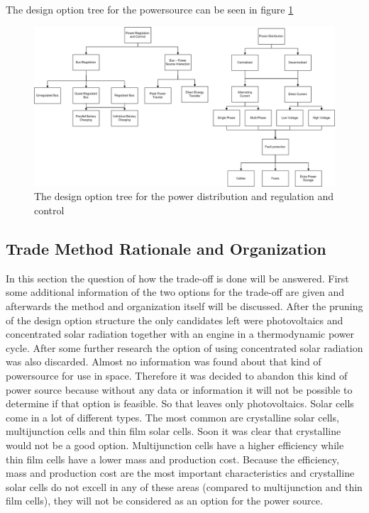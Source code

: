 The design option tree for the powersource can be seen in figure \ref{fig:DOTeps_reganddisPruned}

\begin{figure}
\centering
\includegraphics[width=\textheight, angle=90]{chapters/img/DOTeps_reganddisPruned.png}
\caption{The design option tree for the power distribution and regulation and control}
\label{fig:DOTeps_reganddisPruned}
\end{figure}

\subsection{Trade Method Rationale and Organization}
In this section the question of how the trade-off is done will be answered. First some additional information of the two options for the trade-off are given and afterwards the method and organization itself will be discussed.
After the pruning of the design option structure the only candidates left were photovoltaics and concentrated solar radiation together with an engine in a thermodynamic power cycle. 
After some further research the option of using concentrated solar radiation was also discarded. Almost no information was found about that
kind of powersource for use in space. Therefore it was decided to abandon this kind of power source because without any data or information 
it will not be possible to determine if that option is feasible. So that leaves only photovoltaics. 
Solar cells come in a lot of different types. The most common are crystalline solar cells, multijunction cells and thin film solar cells. Soon it was clear that crystalline would not be a good option. Multijunction cells have a higher efficiency while thin film cells have a lower mass and production cost. Because the efficiency, mass and production cost are the most important characteristics and crystalline solar cells do not excell in any of these areas (compared to multijunction and thin film cells), they will not be considered as an option for the power source.

